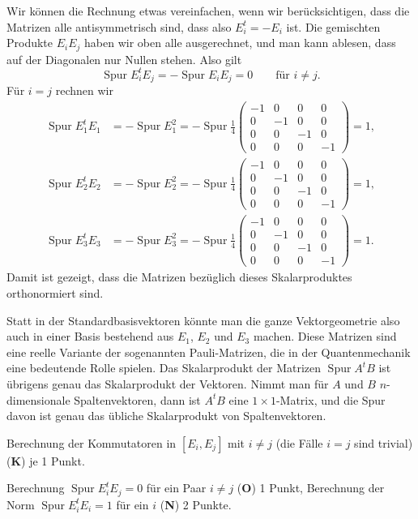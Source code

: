 \begin{loesung}
\begin{teilaufgaben}
Wir können die Rechnung etwas vereinfachen, wenn wir berücksichtigen,
dass die Matrizen alle antisymmetrisch sind, dass also $E_i^t=-E_i$ ist.
Die gemischten Produkte $E_iE_j$ haben wir oben alle ausgerechnet, und
man kann ablesen, dass auf der Diagonalen nur Nullen stehen. Also gilt
\[
\operatorname{Spur}E_i^tE_j
=
-\operatorname{Spur}E_iE_j=0
\qquad
\text{für $i\ne j$}.
\]
Für $i=j$ rechnen wir
\begin{align*}
\operatorname{Spur}E_1^tE_1
&=-\operatorname{Spur}E_1^2
=-\operatorname{Spur}\frac14\begin{pmatrix}
-1& 0& 0& 0\\
 0&-1& 0& 0\\
 0& 0&-1& 0\\
 0& 0& 0&-1
\end{pmatrix}
=1,
\\
\operatorname{Spur}E_2^tE_2
&=-\operatorname{Spur}E_2^2
=-\operatorname{Spur}\frac14\begin{pmatrix}
-1& 0& 0& 0\\
 0&-1& 0& 0\\
 0& 0&-1& 0\\
 0& 0& 0&-1
\end{pmatrix}
=1,
\\
\operatorname{Spur}E_3^tE_3
&=-\operatorname{Spur}E_3^2
=-\operatorname{Spur}\frac14\begin{pmatrix}
-1& 0& 0& 0\\
 0&-1& 0& 0\\
 0& 0&-1& 0\\
 0& 0& 0&-1
\end{pmatrix}
=1.
\end{align*}
Damit ist gezeigt, dass die Matrizen bezüglich dieses Skalarproduktes
orthonormiert sind.
\qedhere
\end{teilaufgaben}
\end{loesung}

\begin{diskussion}
Statt in der Standardbasisvektoren könnte man die ganze Vektorgeometrie
also auch in einer Basis bestehend aus $E_1$, $E_2$ und $E_3$ machen.
Diese Matrizen sind eine reelle Variante der sogenannten
Pauli-Matrizen,
die in der Quantenmechanik eine bedeutende Rolle spielen.
Das Skalarprodukt der Matrizen $\operatorname{Spur}A^tB$ ist übrigens
genau das Skalarprodukt der Vektoren. Nimmt man für $A$ und $B$
$n$-dimensionale Spaltenvektoren, dann ist $A^tB$ eine $1\times 1$-Matrix,
und die Spur davon ist genau das übliche Skalarprodukt von Spaltenvektoren.
\end{diskussion}

\begin{bewertung}
\begin{teilaufgaben}
\item
Berechnung der Kommutatoren in $[E_i,E_j]$ mit $i\ne j$ (die Fälle
$i=j$ sind trivial) ({\bf K}) je 1 Punkt.
\item
Berechnung $\operatorname{Spur}E_i^tE_j=0$ für ein Paar $i\ne j$ ({\bf O})
1 Punkt,
Berechnung der Norm 
$\operatorname{Spur}E_i^tE_i=1$ für ein $i$ ({\bf N}) 2 Punkte.
\end{teilaufgaben}
\end{bewertung}
